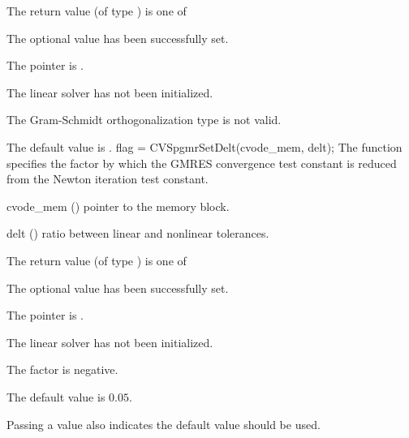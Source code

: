 {
  The return value  (of type ) is one of
  \begin{args}
  \item[\Id{CVSPGMR\_SUCCESS}] 
    The optional value has been successfully set.
  \item[\Id{CVSPGMR\_MEM\_NULL}]
    The  pointer is .
  \item[\Id{CVSPGMR\_LMEM\_NULL}]
    The {\cvspgmr} linear solver has not been initialized.
  \item[\Id{CVSPGMR\_ILL\_INPUT}]
    The Gram-Schmidt orthogonalization type  is not valid.
  \end{args}
}
{
  The default value is .
}
{
  flag = CVSpgmrSetDelt(cvode\_mem, delt);
}
{
  The function  specifies the factor by
  which the GMRES convergence test constant is reduced
  from the Newton iteration test constant.
}
{
  \begin{args}
  \item[cvode\_mem] ()
    pointer to the {\cvodes} memory block.
  \item[delt] () ratio between linear and nonlinear tolerances.

  \end{args}
}
{
  The return value  (of type ) is one of
  \begin{args}
  \item[\Id{CVSPGMR\_SUCCESS}] 
    The optional value has been successfully set.
  \item[\Id{CVSPGMR\_MEM\_NULL}]
    The  pointer is .
  \item[\Id{CVSPGMR\_LMEM\_NULL}]
    The {\cvspgmr} linear solver has not been initialized.
  \item[\Id{CVSPGMR\_ILL\_INPUT}]
    The factor  is negative.  
  \end{args}
}
{
  The default value is $0.05$.

  Passing a value  also indicates the default value should be used.
}

